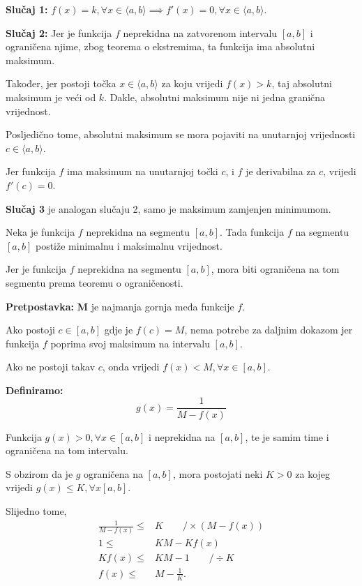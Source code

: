 \noindent
\textbf{Slučaj 1:} $f(x) = k, \forall x\in \langle a,b \rangle \implies f'(x) = 0, \forall x\in \langle a,b \rangle$.

\bigskip
\noindent
\textbf{Slučaj 2:} Jer je funkcija $f$ neprekidna na zatvorenom intervalu $[a,b]$
i ograničena njime, zbog teorema o ekstremima, ta funkcija ima absolutni maksimum.

Također, jer postoji točka $x\in \langle a,b \rangle$ za koju vrijedi $f(x)>k$,
taj absolutni maksimum je veći od $k$.
Dakle, absolutni maksimum nije ni jedna granična vrijednost.

Posljedično tome, absolutni maksimum se mora pojaviti na unutarnjoj vrijednosti
$c\in\langle a,b \rangle$.

Jer funkcija $f$ ima maksimum na unutarnjoj točki $c$, i $f$ je derivabilna za
$c$, vrijedi $f'(c)=0$.

\bigskip
\noindent
\textbf{Slučaj 3} je analogan slučaju 2, samo je maksimum zamjenjen minimumom.

\newpage
\begin{theorem}
    Neka je funkcija $f$ neprekidna na segmentu $[a,b]$. Tada funkcija $f$ na segmentu
    $[a,b]$ postiže minimalnu i maksimalnu vrijednost.

\end{theorem}

Jer je funkcija $f$ neprekidna na segmentu $[a,b]$, mora biti ograničena na tom
segmentu prema teoremu o ograničenosti.

\textbf{Pretpostavka:} $\mathbf{M}$ je najmanja gornja međa funkcije $f$.

Ako postoji $c\in[a,b]$ gdje je $f(c)=M$, nema potrebe za daljnim dokazom jer
funkcija $f$ poprima svoj maksimum na intervalu $[a,b]$.

Ako ne postoji takav $c$, onda vrijedi $f(x)<M, \forall x\in [a,b]$.

\textbf{Definiramo:}
$$
g(x) = \frac{1}{M-f(x)}
$$

Funkcija $g(x)>0,\forall x \in [a,b]$ i neprekidna na $[a,b]$, te je samim time
i ograničena na tom intervalu.

S obzirom da je $g$ ograničena na $[a,b]$, mora postojati neki $K>0$ za kojeg
vrijedi $g(x)\leq K, \forall x [a,b]$.

Slijedno tome,
\begin{align*}
\frac{1}{M-f(x)}\leq& K\qquad/\times(M-f(x))\\
1\leq& KM-Kf(x)\\
Kf(x)\leq& KM - 1\qquad/\div K\\
f(x)\leq& M - \frac{1}{K}.\\
\end{align*}

